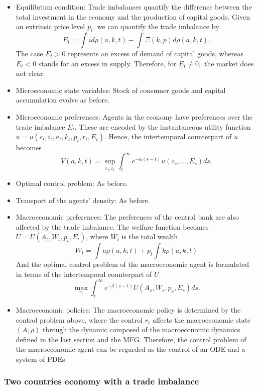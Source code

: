 \documentclass{article}
\begin{document}
\begin{itemize}
    \item Equilibrium condition: Trade imbalances quantify the difference between the
    total investment in the economy and the production of capital goods. 
    Given an extrinsic price level $p_t$, we can quantify the trade imbalance by 
    $$
    E_t = \int i d\rho (a,k,t) - \int \Xi(k,p) d\rho (a,k,t).
    $$
    The case $E_t > 0$ represents an excess of demand of capital goods, whereas
    $E_t < 0$ stands for an excess in supply. Therefore, for $E_t \neq 0,$ the
    market does not clear.
    \item Microeconomic state variables: Stock of consumer goods and capital accumulation 
    evolve as before.
    \item Microeconomic preferences: Agents in the economy have preferences over
    the trade imbalance $E_t$. These are encoded by the instantaneous utility function
    $u = u(c_t, i_t,a_t, k_t, p_t, r_t, E_t).$ Hence, the intertemporal counterpart of $u$ becomes
    $$
    V(a,k,t) = \sup_{c_i, i_t} \int_t^\infty e^{-\alpha (s-t)} u(c_s, ..., E_s) ds.
    $$
    \item Optimal control problem: As before.
    \item Transport of the agents' density: As before.
    \item Macroeconomic preferences: The preferences of the central bank are
    also affected by the trade imbalance. The welfare function becomes 
    $U = U(A_t,W_t,p_t,E_t)$, where $W_t$ is the total wealth
    $$
    W_t = \int a \rho(a,k,t) + p_t \int k \rho (a,k,t)
    $$
    And the optimal control problem of the macroeconomic agent is formulated in
    terms of the intertemporal counterpart of $U$
    $$
    \max_{r_t} \int^\infty_t e^{-\beta (s - t)} U(A_s, W_s, p_s, E_s) ds.
    $$
    \item Macroeconomic policies: The macroeconomic policy is determined by the
    control problem above, where the control $r_t$ affects the 
    macroeconomic state $(A,\rho)$ through the dynamic composed of the macroeconomic
    dynamics defined in the last section and the MFG. Therefore, the control problem
    of the macroeconomic agent can be regarded as the control of an ODE and a system
    of PDEs.
\end{itemize}

\subsubsection{Two countries economy with a trade imbalance}
\end{document}
